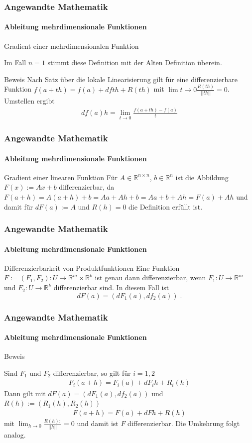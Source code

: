 \documentclass{beamer}
\begin{document}
\begin{frame}
    \frametitle{Angewandte Mathematik}
\framesubtitle{ Ableitung mehrdimensionale Funktionen}
    \begin{block}{Gradient einer  mehrdimensionalen Funktion}

Im Fall $n = 1$ stimmt diese Definition mit der Alten Definition überein.

\end{block}
    \begin{block}{Beweis}
Nach Satz über die lokale Linearisierung gilt für eine differenzierbare Funktion $f(a + th) = f(a) + df th + R(th)$ mit  $\lim{t \to 0} \frac{R(th)}{||t h||} = 0$. Umstellen ergibt
\begin{align*}
df(a) h = \lim_{t \to 0} \frac{f(a + th) - f(a)}{t}
\end{align*} 
\end{block}
 \end{frame}

\begin{frame}
    \frametitle{Angewandte Mathematik}
\framesubtitle{Ableitung mehrdimensionale Funktionen}
    \begin{block}{Gradient einer linearen Funktion}
Für $A \in \mathbb{R}^{n \times n}$, $b \in \mathbb{R}^n$  ist die Abbildung $F(x) := Ax +b$ differenzierbar, da
$F(a +h) = A(a+h) + b = A a+ Ah +b = Aa +b + Ah = F(a) + Ah$ und damit für $dF(a) := A$ und $R(h) = 0$ die Definition
 erfüllt ist.
\end{block}
 \end{frame}


\begin{frame}
    \frametitle{Angewandte Mathematik}
\framesubtitle{Ableitung mehrdimensionale Funktionen}
    \begin{block}{Differenzierbarkeit von Produktfunktionen}
Eine Funktion $F:= (F_1, F_2) : U  \to \mathbb{R}^m \times \mathbb{R}^k$ ist genau dann differenzierbar, 
wenn $F_1 : U  \to \mathbb{R}^m$ und   $F_2 : U  \to \mathbb{R}^k$ differenzierbar sind. In diesem Fall ist
$$dF(a) = (dF_1(a), df_2 (a)) \;.$$ 
\end{block}
 \end{frame}



\begin{frame}
    \frametitle{Angewandte Mathematik}
\framesubtitle{Ableitung mehrdimensionale Funktionen}
    \begin{block}{Beweis}

Sind $F_1$ und $F_2$ differenzierbar, so gilt für $i = 1,2$
\begin{align*}
F_i (a + h) = F_i(a) + dF_ih + R_i(h)
\end{align*}
Dann gilt mit $dF(a) = (dF_1(a), df_2 (a))$ und $R(h):= (R_1(h), R_2(h))$
\begin{align*}
F (a + h) = F (a) + dF h + R(h)
\end{align*}
mit $\lim_{h \to 0} \frac{R(h):}{||h||} = 0$ und damit ist $F$ differenzierbar. Die Umkehrung folgt analog.
\end{block}
 \end{frame}
\end{document}
